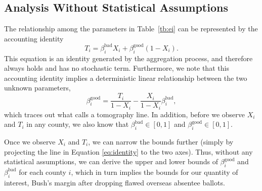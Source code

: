 \documentclass[11pt,titlepage]{article}
\newcommand{\bb}{\beta^{\text{bad}}}
\newcommand{\bg}{\beta^{\text{good}}}
\begin{document}
\subsection{Analysis Without Statistical Assumptions} \label{s:noassump}

The relationship among the parameters in Table~\ref{tb:ei} can be
represented by the accounting identity
\begin{equation} \label{eq:gid}
  T_i=\bb_i X_i+\bg_i (1-X_i).
\end{equation} 
This equation is an identity generated by the aggregation process, and
therefore always holds and has no stochastic term.  Furthermore, we
note that this accounting identity implies a deterministic linear
relationship between the two unknown parameters,
\begin{equation} \label{eq:identity}
\bg_i = \frac{T_i}{1-X_i}-\frac{X_i}{1-X_i}\bb_i,
\end{equation}
which traces out what \citet{king:97} calls a tomography line.  In
addition, before we observe $X_i$ and $T_i$ in any county, we also
know that $\bb_i\in[0,1]$ and $\bg_i\in[0,1]$.

Once we observe $X_i$ and $T_i$, we can narrow the bounds further
(simply by projecting the line in Equation \ref{eq:identity} to the
two axes).  Thus, without any statistical assumptions, we can derive
the upper and lower bounds of $\bg_i$ and $\bb_i$ for each county $i$,
which in turn implies the bounds for our quantity of interest, Bush's
margin after dropping flawed overseas absentee ballots.
\end{document}

